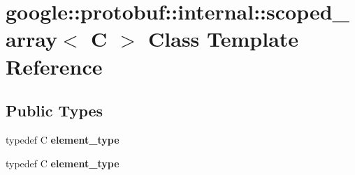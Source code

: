 \hypertarget{classgoogle_1_1protobuf_1_1internal_1_1scoped__array}{}\section{google\+:\+:protobuf\+:\+:internal\+:\+:scoped\+\_\+array$<$ C $>$ Class Template Reference}
\label{classgoogle_1_1protobuf_1_1internal_1_1scoped__array}
\subsection*{Public Types}
\begin{DoxyCompactItemize}
\item 
\mbox{\label{classgoogle_1_1protobuf_1_1internal_1_1scoped__array_a8d42a0ac5a02a48bb36e17a16dc30e36}} 
typedef C {\bfseries element\+\_\+type}
\item 
\mbox{\label{classgoogle_1_1protobuf_1_1internal_1_1scoped__array_a8d42a0ac5a02a48bb36e17a16dc30e36}} 
typedef C {\bfseries element\+\_\+type}
\end{DoxyCompactItemize}
